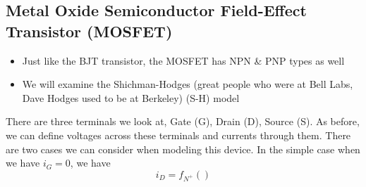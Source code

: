 \documentclass{report}
\begin{document}

\subsection{Metal Oxide Semiconductor Field-Effect Transistor (MOSFET)}
\begin{itemize}
    \item Just like the BJT transistor, the MOSFET has NPN \& PNP types as well
    \item We will examine the Shichman-Hodges (great people who were at Bell Labs, Dave Hodges used to be at Berkeley) (S-H) model
\end{itemize} 
There are three terminals we look at, Gate (G), Drain (D), Source (S). As before, we can define voltages across these terminals and currents through them.
There are two cases we can consider when modeling this device. In the simple case when we have $i_G = 0$, we have
\begin{equation*}
    i_D = f_{N^+}() %
\end{equation*}
\end{document}
